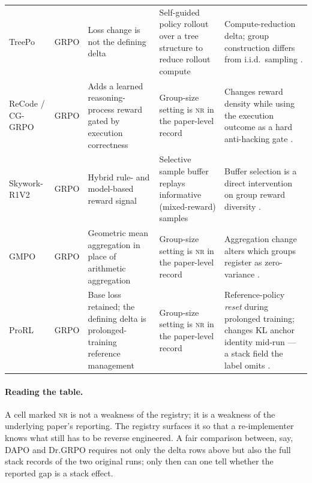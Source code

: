 \documentclass[11pt]{article}
\newcommand{\nr}{\textsc{nr}}
\newcommand{\grpo}{\textsc{GRPO}}
\begin{document}
\begin{longtable}{@{}p{2.1cm}p{2.4cm}p{3.0cm}p{2.0cm}p{3.3cm}@{}}
TreePo & \grpo{} & Loss change is not the defining delta & Self-guided policy rollout over a
  tree structure to reduce rollout compute & Compute-reduction delta; group
  construction differs from i.i.d.\ sampling \cite{treepo2025,agenticrlsurvey2026}.\\
\addlinespace

ReCode / CG-\grpo{} & \grpo{} & Adds a learned reasoning-process reward gated
  by execution correctness & Group-size setting is \nr{} in the paper-level
  record & Changes reward density while
  using the execution outcome as a hard anti-hacking gate
  \cite{fan2025recode,agenticrlsurvey2026}.\\
\addlinespace

Skywork-R1V2 & \grpo{} & Hybrid rule- and model-based reward signal & Selective
  sample buffer replays informative (mixed-reward) samples & Buffer selection
  is a direct intervention on group reward diversity
  \cite{skyworkr1v2-2025,agenticrlsurvey2026}.\\
\addlinespace

GMPO & \grpo{} & Geometric mean aggregation in place of arithmetic aggregation
  & Group-size setting is \nr{} in the paper-level record & Aggregation change alters which groups
  register as zero-variance \cite{gmpo2025,agenticrlsurvey2026}.\\
\addlinespace

ProRL & \grpo{} & Base loss retained; the defining delta is prolonged-training
  reference management & Group-size setting is \nr{} in the paper-level record &
  Reference-policy \emph{reset} during prolonged training; changes KL anchor
  identity mid-run --- a stack field the label omits
  \cite{prorl2025,agenticrlsurvey2026}.\\

\end{longtable}
\label{tab:catalog}

\paragraph{Reading the table.} A cell marked \nr{} is not a weakness of the
registry; it is a weakness of the underlying paper's reporting. The registry
surfaces it so that a re-implementer knows what still has to be reverse
engineered. A fair comparison between, say, DAPO and Dr.\grpo{} requires not
only the delta rows above but also the full stack records of the two original
runs; only then can one tell whether the reported gap is a stack effect.
\end{document}
